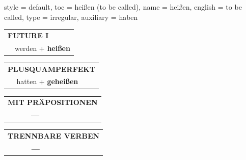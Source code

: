 \begin{verbentry}{
  style = {default},
  toc = {heißen (to be called)},
  name = {heißen},
  english = {to be called},
  type = {irregular},
  auxiliary = {haben}
}
\begin{tabular}{rl}
    \multicolumn{2}{l}{\textbf{FUTURE I} }\\
   & werden + \textbf{heißen}\\
 
  \end{tabular}
\hfill
   \begin{tabular}{rl}
      \multicolumn{2}{l}{\textbf{PLUSQUAMPERFEKT}}\\
   & hatten + \textbf{geheißen}\\
  \end{tabular}
  
  \vspace{10pt}



\begin{tabular}{lll}
\multicolumn{3}{l}{\textbf{MIT PRÄPOSITIONEN}}\\
& \textbf{---} & \\
\end{tabular}
\hfill
\begin{tabular}{lll}
\multicolumn{3}{l}{\textbf{TRENNBARE VERBEN}}\\
& \textbf{---} & \\
\end{tabular}

  \vspace{-5pt}
\end{verbentry}


